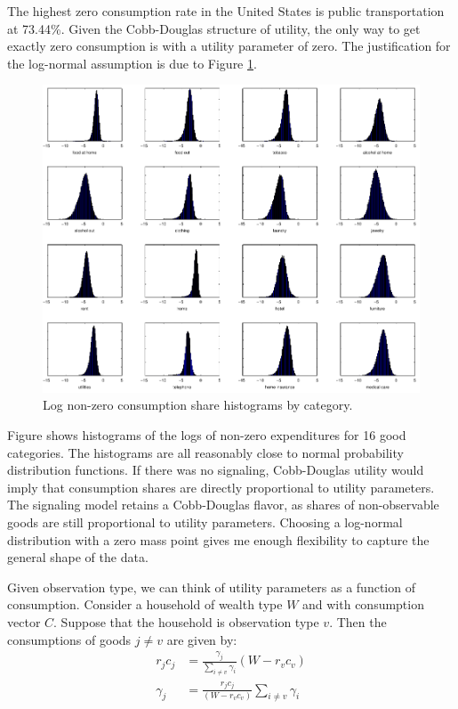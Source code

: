 \documentclass{article}
\begin{document}
The highest zero consumption rate in the United States is public transportation at 73.44\%.  
Given the Cobb-Douglas structure of utility, the only way to get exactly zero consumption is with a utility parameter of zero.
The justification for the log-normal assumption is due to Figure \ref{fig:shrplot}.
\begin{figure}
	\begin{center}
		\includegraphics[scale=1]{pics/shrplot_cropped.pdf}
	\end{center}
	\caption{Log non-zero consumption share histograms by category.}
	\label{fig:shrplot}
\end{figure}
Figure  shows histograms of the logs of non-zero expenditures for 16 good categories.  
The histograms are all reasonably close to normal probability distribution functions.
If there was no signaling, Cobb-Douglas utility would imply that consumption shares are directly proportional to utility parameters.
The signaling model retains a Cobb-Douglas flavor, as shares of non-observable goods are still proportional to utility parameters.
Choosing a log-normal distribution with a zero mass point gives me enough flexibility to capture the general shape of the data.

Given observation type, we can think of utility parameters as a function of consumption.  Consider a household of wealth type $W$ and with consumption vector $C$.  
Suppose that the household is observation type $v$.
Then the consumptions of goods $j\neq v$ are given by:
\begin{align}
	\label{eq:sgd}
	r_jc_j &= \frac{\gamma_j}{\sum_{i\neq v}\gamma_i}  \left(W-  r_v c_v\right)\\
	\label{eq:sgdsol}
	\gamma_j &= \frac{r_j c_j}{\left(W- r_v c_v\right)} \sum_{i\neq v}\gamma_i  
\end{align}
\end{document}
